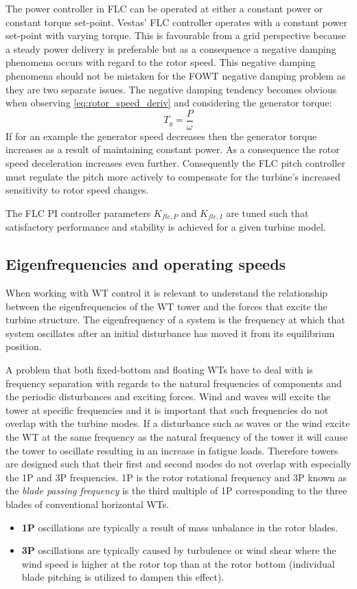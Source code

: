 The power controller in FLC can be operated at either a constant power or constant torque set-point. Vestas' FLC controller operates with a constant power set-point with varying torque. This is favourable from a grid perspective because a steady power delivery is preferable but as a consequence a negative damping phenomena occurs with regard to the rotor speed. This negative damping phenomena should not be mistaken for the FOWT negative damping problem as they are two separate issues. The negative damping tendency becomes obvious when observing \cref{eq:rotor_speed_deriv} and considering the generator torque:
\begin{equation}\label{eq:gen_torque}
	T_g = \dfrac{P}{\omega}
\end{equation}
If for an example the generator speed decreases then the generator torque increases as a result of maintaining constant power. As a consequence the rotor speed deceleration increases even further. Consequently the FLC pitch controller must regulate the pitch more actively to compensate for the turbine's increased sensitivity to rotor speed changes.

The FLC PI controller parameters $ K_{flc,P} $ and $ K_{flc,I} $ are tuned such that satisfactory performance and stability is achieved for a given turbine model. 


\subsection{Eigenfrequencies and operating speeds} \label{sec:theory_eigenfreq}
When working with WT control it is relevant to understand the relationship between the eigenfrequencies of the WT tower and the forces that excite the turbine structure. The eigenfrequency of a system is the frequency at which that system oscillates after an initial disturbance has moved it from its equilibrium position.

A problem that both fixed-bottom and floating WTs have to deal with is frequency separation with regards to the natural frequencies of components and the periodic disturbances and exciting forces. Wind and waves will excite the tower at specific frequencies and it is important that such frequencies do not overlap with the turbine modes. If a disturbance such as waves or the wind excite the WT at the same frequency as the natural frequency of the tower it will cause the tower to oscillate resulting in an increase in fatigue loads. Therefore towers are designed such that their first and second modes do not overlap with especially the 1P and 3P frequencies. 1P is the rotor rotational frequency and 3P known as the \textit{blade passing frequency} is the third multiple of 1P corresponding to the three blades of conventional horizontal WTs.
\begin{itemize}
	\item \textbf{1P} oscillations are typically a result of mass unbalance in the rotor blades.
	\item \textbf{3P} oscillations are typically caused by turbulence or wind shear where the wind speed is higher at the rotor top than at the rotor bottom (individual blade pitching is utilized to dampen this effect).
\end{itemize}

